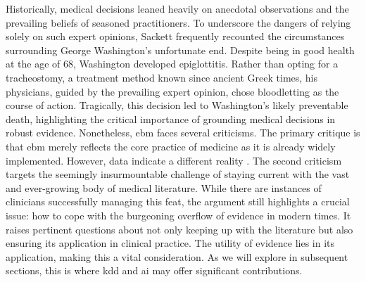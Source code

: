 Historically, medical decisions leaned heavily on anecdotal observations and the prevailing beliefs of seasoned practitioners. To underscore the dangers of relying solely on such expert opinions, Sackett frequently recounted the circumstances surrounding George Washington's unfortunate end. Despite being in good health at the age of 68, Washington developed epiglottitis. Rather than opting for a tracheostomy, a treatment method known since ancient Greek times, his physicians, guided by the prevailing expert opinion, chose bloodletting as the course of action. Tragically, this decision led to Washington's likely preventable death, highlighting the critical importance of grounding medical decisions in robust evidence.
Nonetheless, \ac{ebm} faces several criticisms. The primary critique is that \ac{ebm} merely reflects the core practice of medicine as it is already widely implemented. However, data indicate a different reality \cite{sackettEvidenceBasedMedicine1996}.
The second criticism targets the seemingly insurmountable challenge of staying current with the vast and ever-growing body of medical literature. While there are instances of clinicians successfully managing this feat, the argument still highlights a crucial issue: how to cope with the burgeoning overflow of evidence in modern times. It raises pertinent questions about not only keeping up with the literature but also ensuring its application in clinical practice. The utility of evidence lies in its application, making this a vital consideration. As we will explore in subsequent sections, this is where \ac{kdd} and \ac{ai} may offer significant contributions.
